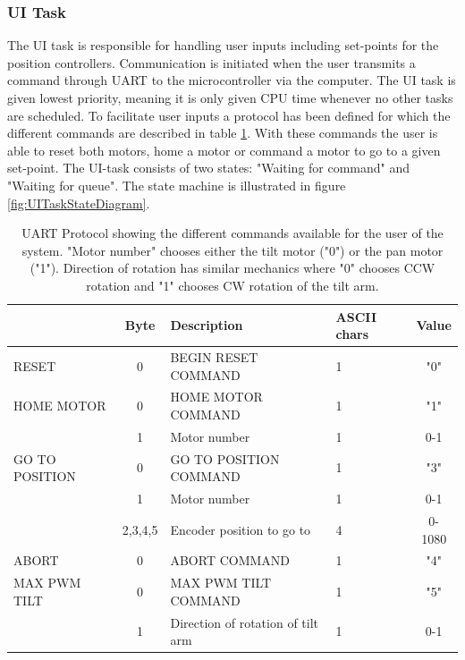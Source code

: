 \documentclass[../../main.tex]{subfiles}
\begin{document}
\subsubsection*{UI Task}
The UI task is responsible for handling user inputs including set-points for the position controllers. Communication is initiated when the user transmits a command through UART to the microcontroller via the computer. The UI task is given lowest priority, meaning it is only given CPU time whenever no other tasks are scheduled. To facilitate user inputs a protocol has been defined for which the different commands are described in table \ref{tab:UART_UI_PROTOCOL}. With these commands the user is able to reset both motors, home a motor or command a motor to go to a given set-point. The UI-task consists of two states: "Waiting for command" and "Waiting for queue". The state machine is illustrated in figure
\ref{fig:UITaskStateDiagram}. 

\begin{table}[H]
    \centering
    
    \begin{tabular}{l|c|l|p{}|c} %
              & Byte & Description & ASCII chars & Value  \\
        \hline
        RESET & 0 & BEGIN RESET COMMAND & 1 & "0" \\
        \hline
        HOME MOTOR  & 0 & HOME MOTOR COMMAND & 1 & "1" \\
                    & 1 & Motor number & 1 & 0-1 \\
        \hline
        GO TO POSITION & 0 & GO TO POSITION COMMAND & 1 & "3" \\
            & 1 & Motor number & 1 & 0-1 \\
            & 2,3,4,5 & Encoder position to go to & 4 & 0-1080 \\
        \hline
        ABORT & 0 & ABORT COMMAND & 1 & "4" \\
        \hline
        MAX PWM TILT & 0 & MAX PWM TILT COMMAND & 1 & "5" \\
       & 1 & Direction of rotation of tilt arm & 1 & 0-1
    \end{tabular}    
    
    \caption{UART Protocol showing the different commands available for the user of the system. "Motor number" chooses either the tilt motor ("0") or the pan motor ("1"). Direction of rotation has similar mechanics where "0" chooses CCW rotation and "1" chooses CW rotation of the tilt arm.}
    \label{tab:UART_UI_PROTOCOL}
\end{table}
\end{document}
